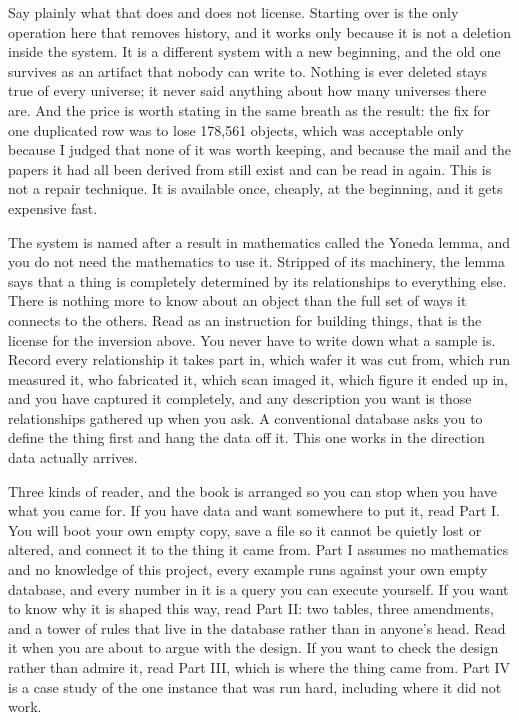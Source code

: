 Say plainly what that does and does not license. Starting over is the only operation here that removes history, and it works only because it is not a deletion inside the system. It is a different system with a new beginning, and the old one survives as an artifact that nobody can write to. Nothing is ever deleted stays true of every universe; it never said anything about how many universes there are. And the price is worth stating in the same breath as the result: the fix for one duplicated row was to lose 178,561 objects, which was acceptable only because I judged that none of it was worth keeping, and because the mail and the papers it had all been derived from still exist and can be read in again. This is not a repair technique. It is available once, cheaply, at the beginning, and it gets expensive fast.

The system is named after a result in mathematics called the Yoneda lemma, and you do not need the mathematics to use it. Stripped of its machinery, the lemma says that a thing is completely determined by its relationships to everything else. There is nothing more to know about an object than the full set of ways it connects to the others. Read as an instruction for building things, that is the license for the inversion above. You never have to write down what a sample is. Record every relationship it takes part in, which wafer it was cut from, which run measured it, who fabricated it, which scan imaged it, which figure it ended up in, and you have captured it completely, and any description you want is those relationships gathered up when you ask. A conventional database asks you to define the thing first and hang the data off it. This one works in the direction data actually arrives.

Three kinds of reader, and the book is arranged so you can stop when you have what you came for. If you have data and want somewhere to put it, read Part I. You will boot your own empty copy, save a file so it cannot be quietly lost or altered, and connect it to the thing it came from. Part I assumes no mathematics and no knowledge of this project, every example runs against your own empty database, and every number in it is a query you can execute yourself. If you want to know why it is shaped this way, read Part II: two tables, three amendments, and a tower of rules that live in the database rather than in anyone's head. Read it when you are about to argue with the design. If you want to check the design rather than admire it, read Part III, which is where the thing came from. Part IV is a case study of the one instance that was run hard, including where it did not work.


